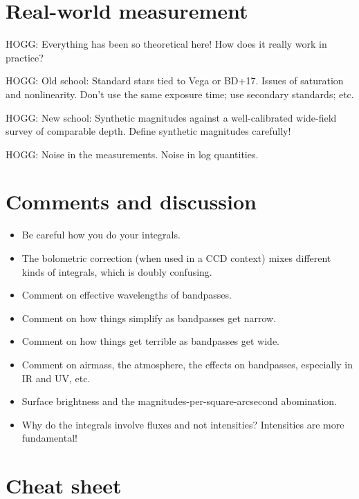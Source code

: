 \documentclass[10pt]{article}
\begin{document}
\section{Real-world measurement}\label{sec:practice}

HOGG: Everything has been so theoretical here! How does it really work in practice?

HOGG: Old school: Standard stars tied to Vega or BD+17. Issues of saturation and nonlinearity. Don't use the same exposure time; use secondary standards; etc.

HOGG: New school: Synthetic magnitudes against a well-calibrated wide-field survey of comparable depth. Define synthetic magnitudes carefully!

HOGG: Noise in the measurements. Noise in log quantities.

\section{Comments and discussion}\label{sec:discussion}

\begin{itemize}
\item Be careful how you do your integrals.
\item The bolometric correction (when used in a CCD context) mixes different kinds of integrals, which is doubly confusing.
\item Comment on effective wavelengths of bandpasses.
\item Comment on how things simplify as bandpasses get narrow.
\item Comment on how things get terrible as bandpasses get wide.
\item Comment on airmass, the atmosphere, the effects on bandpasses, especially in IR and UV, etc.
\item Surface brightness and the magnitudes-per-square-arcsecond abomination.
\item Why do the integrals involve fluxes and not intensities? Intensities are more fundamental!
\end{itemize}


\raggedright


\clearpage\appendix
\section{Cheat sheet}
\end{document}
